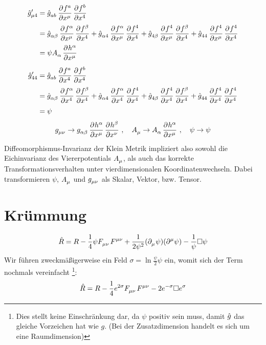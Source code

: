 \begin{equation}
\begin{split}
\tensor*{\fived{g}}{*^\prime_\mu_4}&=\tensor{\fived{g}}{_a_b}\dpd{f^a}{\tensor{x}{^\mu}}\dpd{f^b}{\tensor{x}{^4}}\\
&=\tensor{\fived{g}}{_\alpha_\beta}\dpd{f^\alpha}{\tensor{x}{^\mu}}\dpd{f^\beta}{\tensor{x}{^4}}
+\tensor{\fived{g}}{_\alpha_4}\dpd{f^\alpha}{\tensor{x}{^\mu}}\dpd{f^4}{\tensor{x}{^4}}
+\tensor{\fived{g}}{_4_\beta}\dpd{f^4}{\tensor{x}{^\mu}}\dpd{f^\beta}{\tensor{x}{^4}}
+\tensor{\fived{g}}{_4_4}\dpd{f^4}{\tensor{x}{^\mu}}\dpd{f^4}{\tensor{x}{^4}}\\
&=\psi\tensor{A}{_\alpha}\dpd{h^\alpha}{\tensor{x}{^\mu}}
\end{split}
\end{equation}
\begin{equation}
\begin{split}
\tensor*{\fived{g}}{*^\prime_4_4}&=\tensor{\fived{g}}{_a_b}\dpd{f^a}{\tensor{x}{^4}}\dpd{f^b}{\tensor{x}{^4}}\\
&=\tensor{\fived{g}}{_\alpha_\beta}\dpd{f^\alpha}{\tensor{x}{^4}}\dpd{f^\beta}{\tensor{x}{^4}}
+\tensor{\fived{g}}{_\alpha_4}\dpd{f^\alpha}{\tensor{x}{^4}}\dpd{f^4}{\tensor{x}{^4}}
+\tensor{\fived{g}}{_4_\beta}\dpd{f^4}{\tensor{x}{^4}}\dpd{f^\beta}{\tensor{x}{^4}}
+\tensor{\fived{g}}{_4_4}\dpd{f^4}{\tensor{x}{^4}}\dpd{f^4}{\tensor{x}{^4}}\\
&=\psi
\end{split}
\end{equation}
\begin{equation}
\tensor{g}{_\mu_\nu}\to\tensor{g}{_\alpha_\beta}\dpd{h^\alpha}{\tensor{x}{^\mu}}\dpd{h^\beta}{\tensor{x}{^\nu}}\,,\quad
\tensor{A}{_\mu}\to\tensor{A}{_\alpha}\dpd{h^\alpha}{\tensor{x}{^\mu}}\,,\quad
\psi\to\psi
\end{equation}
Diffeomorphismus-Invarianz der Klein Metrik impliziert also sowohl die
Eichinvarianz des Viererpotentials $\tensor{A}{_\mu}$, als auch das korrekte
Transformationsverhalten unter vierdimensionalen Koordinatenwechseln.
Dabei transformieren $\psi$, $\tensor{A}{_\mu}$ und $\tensor{g}{_\mu_\nu}$ als
Skalar, Vektor, bzw. Tensor.
\section{Krümmung}
\begin{equation}
\fived{R}=R-\frac{1}{4}\psi\tensor{F}{_\mu_\nu}\tensor{F}{^\mu^\nu}
+\frac{1}{2\psi^2}(\pdif{_\mu}\psi)(\pdif{^\mu}\psi)
-\frac{1}{\psi}\square\psi
\end{equation}
Wir führen zweckmäßigerweise ein Feld
$\sigma=\ln\frac{\psi}{2}\psi$ ein, womit sich der Term nochmals
vereinfacht \footnote{Dies stellt keine Einschränkung dar, da $\psi$ positiv sein muss, damit $\hat{g}$ das gleiche Vorzeichen hat wie $g$. (Bei der Zusatzdimension handelt es sich um
eine Raumdimension)}:
\begin{equation}
\fived{R}=R-\frac{1}{4}e^{2\sigma}\tensor{F}{_\mu_\nu}\tensor{F}{^\mu^\nu}
-2e^{-\sigma}\square e^{\sigma}
\end{equation}
